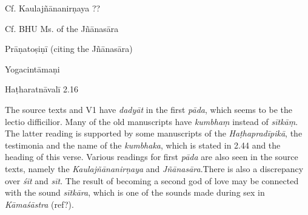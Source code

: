 \begin{ekdosis}
\begin{sources}[hp02_054]
Cf. Kaulajñānanirṇaya ??

\begin{versinnote}
\end{versinnote}

Cf. BHU Ms. of the Jñānasāra

\begin{versinnote}
\end{versinnote}

Prāṇatoṣiṇī (citing the Jñānasāra)

\begin{versinnote}
\end{versinnote}
\end{sources}

\begin{testimonia}[hp02_054]
Yogacintāmaṇi

\begin{versinnote}
\end{versinnote}

Haṭharatnāvalī 2.16

\begin{versinnote}
\end{versinnote}
\end{testimonia}

\begin{philcomm}[hp02_054]
The source texts and V1 have \emph{dadyāt} in the first \emph{pāda}, which seems to be the lectio difficilior. Many of the old manuscripts have \emph{kumbhaṃ} instead of \emph{sītkāṃ}. The latter reading is supported by some manuscripts of the \emph{Haṭhapradīpikā}, the testimonia and the name of the \emph{kumbhaka}, which is stated in 2.44 and the heading of this verse. Various readings for first \emph{pāda} are also seen in the source texts, namely the \emph{Kaulajñānanirṇaya} and \emph{Jñānasāra}.There is also a discrepancy over \emph{śīt} and \emph{sīt}. The result of becoming a second god of love may be connected with the sound \emph{sītkāra}, which is one of the sounds made during sex in \emph{Kāmaśāstra} (ref?).


\end{philcomm}
\end{ekdosis}
